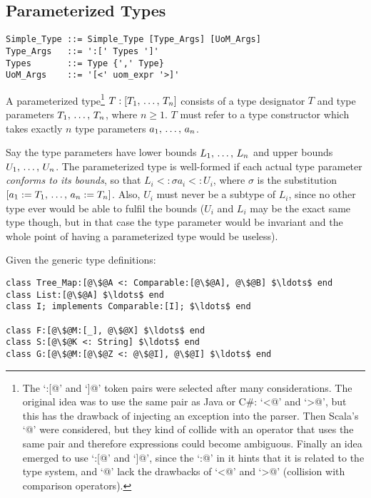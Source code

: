 \subsection{Parameterized Types}
\label{sec:parameterized-types}

\syntax\begin{lstlisting}
Simple_Type ::= Simple_Type [Type_Args] [UoM_Args]
Type_Args   ::= ':[' Types ']'
Types       ::= Type {',' Type}
UoM_Args    ::= '[<' uom_expr '>]'
\end{lstlisting}

A parameterized type\footnote{The `\lstinline@:[@' and `\lstinline@]@' token pairs were selected after many considerations. The original idea was to use the same pair as Java or C\#: `\lstinline@<@' and `\lstinline@>@', but this has the drawback of injecting an exception into the parser. Then Scala's `@' were considered, but they kind of collide with an operator that uses the same pair and therefore expressions could become ambiguous. Finally an idea emerged to use `\lstinline@:[@' and `\lstinline@]@', since the `\lstinline@:@' in it hints that it is related to the type system, and `@' lack the drawbacks of `\lstinline@<@' and `\lstinline@>@' (collision with comparison operators).} $T:[T_1 ,\, \ldots ,\, T_n]$ consists of a type designator $T$ and type parameters $T_1 ,\, \ldots ,\, T_n$, where $n \geq 1$. $T$ must refer to a type constructor which takes exactly $n$ type parameters $a_1 ,\, \ldots ,\, a_n$. 

Say the type parameters have lower bounds $L_1 ,\, \ldots ,\, L_n$ and upper bounds $U_1 ,\, \ldots ,\, U_n$. The parameterized type is well-formed if each actual type parameter {\em conforms to its bounds}, so that $L_i <: \sigma a_i <: U_i$, where $\sigma$ is the substitution $[a_1 := T_1 ,\, \ldots ,\, a_n := T_n]$. Also, $U_i$ must never be a subtype of $L_i$, since no other type ever would be able to fulfil the bounds ($U_i$ and $L_i$ may be the exact same type though, but in that case the type parameter would be invariant and the whole point of having a parameterized type would be useless). 

\example
\label{example:parameterized-types}
Given the generic type definitions: 

\begin{lstlisting}[escapechar=@]
class Tree_Map:[@\$@A <: Comparable:[@\$@A], @\$@B] $\ldots$ end
class List:[@\$@A] $\ldots$ end
class I; implements Comparable:[I]; $\ldots$ end

class F:[@\$@M:[_], @\$@X] $\ldots$ end
class S:[@\$@K <: String] $\ldots$ end
class G:[@\$@M:[@\$@Z <: @\$@I], @\$@I] $\ldots$ end
\end{lstlisting}

